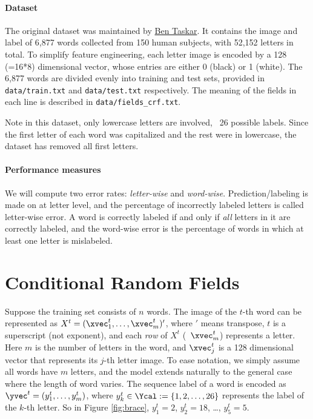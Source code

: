 \documentclass[11pt]{report}
\begin{document}
\paragraph{Dataset}
The original dataset was maintained by \href{https://en.wikipedia.org/wiki/Ben_Taskar}{Ben Taskar}.
It contains the image and label of 6,877 words collected from 150 human subjects,
with 52,152 letters in total.
To simplify feature engineering, each letter image is encoded by a 128 (=16*8) dimensional vector,
whose entries are either 0 (black) or 1 (white).
The 6,877 words are divided evenly into training and test sets,
provided in \verb#data/train.txt# and \verb#data/test.txt# respectively.
The meaning of the fields in each line is described in \verb#data/fields_crf.txt#.


Note in this dataset, only lowercase letters are involved, \ie\ 26 possible labels.
Since the first letter of each word was capitalized and the rest were in lowercase,
the dataset has removed all first letters.


\paragraph{Performance measures}
%
We will compute two error rates: \emph{letter-wise} and \emph{word-wise}.
Prediction/labeling is made on at letter level,
and the percentage of incorrectly labeled letters is called letter-wise error.
A word is correctly labeled if and only if \emph{all} letters in it are correctly labeled,
and the word-wise error is the percentage of words in which at least one letter is mislabeled.


\section{Conditional Random Fields}

Suppose the training set consists of $n$ words.
The image of the $t$-th word can be represented as
$X^t = (\xvec^t_1, \ldots, \xvec^t_m)'$,
where $'$ means transpose,
$t$ is a superscript (not exponent),
and each \emph{row} of $X^t$ (\eg\ $\xvec^t_m$) represents a letter.
Here $m$ is the number of letters in the word,
and $\xvec^t_j$ is a 128 dimensional vector that represents its $j$-th letter image.
To ease notation, we simply assume all words have $m$ letters,
and the model extends naturally to the general case where the length of word varies.
The sequence label of a word is encoded as
$\yvec^t = (y^t_1, \ldots, y^t_m)$,
where $y^t_k \in \Ycal := \{1, 2, \ldots, 26\}$ represents the label of the $k$-th letter.
So in Figure \ref{fig:brace}, $y^t_1 = 2$, $y^t_2 = 18$, \ldots, $y^t_5 = 5$.
\end{document}
